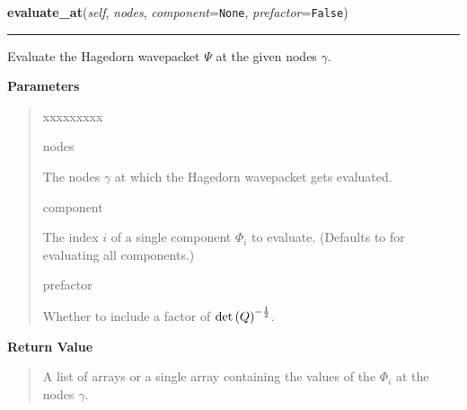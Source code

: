 \hspace{.8\funcindent}\begin{boxedminipage}{\funcwidth}

    \raggedright \textbf{evaluate\_at}(\textit{self}, \textit{nodes}, \textit{component}={\tt None}, \textit{prefactor}={\tt False})

    \vspace{-1.5ex}

    \rule{\textwidth}{0.5\fboxrule}
\setlength{\parskip}{2ex}
    Evaluate the Hagedorn wavepacket $\Psi$ at the given
    nodes $\gamma$.

\setlength{\parskip}{1ex}
      \textbf{Parameters}
      \vspace{-1ex}

      \begin{quote}
        \begin{Ventry}{xxxxxxxxx}

          \item[nodes]

          The nodes $\gamma$ at which the Hagedorn
          wavepacket gets evaluated.

          \item[component]

          The index $i$ of a single component $\Phi_i$
          to evaluate. (Defaults to  for evaluating all components.)

          \item[prefactor]

          Whether to include a factor of
          $\det\left( Q \right)^{-\frac{1}{2}}$.

        \end{Ventry}

      \end{quote}

      \textbf{Return Value}
    \vspace{-1ex}

      \begin{quote}
      A list of arrays or a single array containing the values of the
      $\Phi_i$ at the nodes $\gamma$.

      \end{quote}

    \end{boxedminipage}

    \label{HagedornWavepacket:HagedornWavepacket:quadrate}

